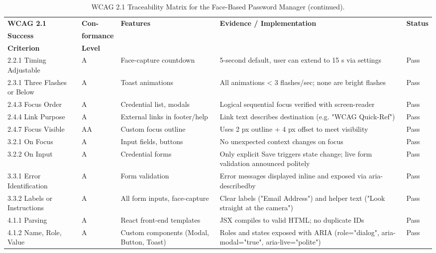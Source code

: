 \begin{table}[htbp]
  \centering
  \small
  \begin{tabular}{|p{2.5cm}|p{1.5cm}|p{4cm}|p{4cm}|p{1.2cm}|}
    \hline
    \textbf{WCAG 2.1} & \textbf{Con-} & \textbf{Features} & \textbf{Evidence / Implementation} & \textbf{Status} \\
    \textbf{Success} & \textbf{formance} & & & \\
    \textbf{Criterion} & \textbf{Level} & & & \\ \hline
    
    2.2.1 Timing Adjustable & A & Face-capture countdown & 5-second default, user can extend to 15 s via settings & Pass \\ \hline
    
    2.3.1 Three Flashes or Below & A & Toast animations & All animations < 3 flashes/sec; none are bright flashes & Pass \\ \hline
    
    2.4.3 Focus Order & A & Credential list, modals & Logical sequential focus verified with screen-reader & Pass \\ \hline
    
    2.4.4 Link Purpose & A & External links in footer/help & Link text describes destination (e.g. "WCAG Quick-Ref") & Pass \\ \hline
    
    2.4.7 Focus Visible & AA & Custom focus outline & Uses 2 px outline + 4 px offset to meet visibility & Pass \\ \hline
    
    3.2.1 On Focus & A & Input fields, buttons & No unexpected context changes on focus & Pass \\ \hline
    
    3.2.2 On Input & A & Credential forms & Only explicit Save triggers state change; live form validation announced politely & Pass \\ \hline
    
    3.3.1 Error Identification & A & Form validation & Error messages displayed inline and exposed via aria-describedby & Pass \\ \hline
    
    3.3.2 Labels or Instructions & A & All form inputs, face-capture & Clear labels ("Email Address") and helper text ("Look straight at the camera") & Pass \\ \hline
    
    4.1.1 Parsing & A & React front-end templates & JSX compiles to valid HTML; no duplicate IDs & Pass \\ \hline
    
    4.1.2 Name, Role, Value & A & Custom components (Modal, Button, Toast) & Roles and states exposed with ARIA (role="dialog", aria-modal="true", aria-live="polite") & Pass \\ \hline
  \end{tabular}
  \caption[WCAG 2.1 Traceability Matrix (continued)]{WCAG 2.1 Traceability Matrix for the Face-Based Password Manager (continued).}
  \label{tab:wcag-matrix-cont}
\end{table}



